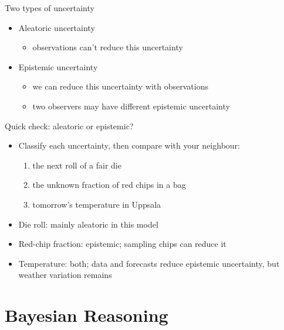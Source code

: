 \documentclass[10pt]{beamer}
\begin{document}
\begin{frame}{Two types of uncertainty}

  \begin{itemize}
  \item Aleatoric uncertainty 
    \begin{itemize}
    \item<1-> observations can't reduce this uncertainty
    \end{itemize}
    \vspace{\baselineskip}
  \item Epistemic uncertainty 
    \begin{itemize}
    \item<2-> we can reduce this uncertainty with observations
    \item<3-> two observers may have different epistemic uncertainty
    \end{itemize}
  \end{itemize}
\end{frame}


\begin{frame}{Quick check: aleatoric or epistemic?}

  \begin{itemize}
  \item Classify each uncertainty, then compare with your neighbour:
    \begin{enumerate}
    \item the next roll of a fair die
    \item the unknown fraction of red chips in a bag
    \item tomorrow's temperature in Uppsala
    \end{enumerate}
  \pause
  \item Die roll: mainly aleatoric in this model
  \item Red-chip fraction: epistemic; sampling chips can reduce it
  \item Temperature: both; data and forecasts reduce epistemic uncertainty, but weather variation remains
  \end{itemize}

\end{frame}


\section{Bayesian Reasoning}
\frame{\sectionpage}
\end{document}

